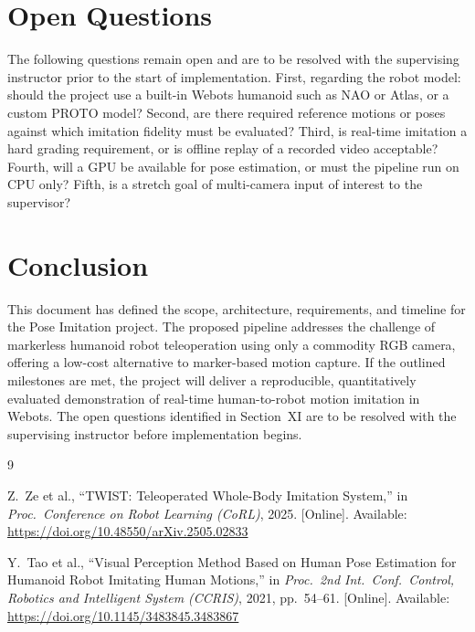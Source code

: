 \documentclass[conference]{IEEEtran}
\begin{document}
\section{Open Questions}
The following questions remain open and are to be resolved with the supervising instructor
prior to the start of implementation. First, regarding the robot model: should the project
use a built-in Webots humanoid such as NAO or Atlas, or a custom PROTO model? Second, are
there required reference motions or poses against which imitation fidelity must be evaluated?
Third, is real-time imitation a hard grading requirement, or is offline replay of a recorded
video acceptable? Fourth, will a GPU be available for pose estimation, or must the pipeline
run on CPU only? Fifth, is a stretch goal of multi-camera input of interest to the supervisor?
 
\section{Conclusion}
This document has defined the scope, architecture, requirements, and timeline for the Pose
Imitation project. The proposed pipeline addresses the challenge of markerless humanoid robot
teleoperation using only a commodity RGB camera, offering a low-cost alternative to
marker-based motion capture. If the outlined milestones are met, the project will deliver a
reproducible, quantitatively evaluated demonstration of real-time human-to-robot motion
imitation in Webots. The open questions identified in Section~XI are to be resolved with the
supervising instructor before implementation begins.
 
\begin{thebibliography}{9}
 
Z.~Ze et al., ``TWIST: Teleoperated Whole-Body Imitation System,''
in \textit{Proc.\ Conference on Robot Learning (CoRL)}, 2025.
[Online]. Available: \url{https://doi.org/10.48550/arXiv.2505.02833}
 
Y.~Tao et al., ``Visual Perception Method Based on Human Pose Estimation for Humanoid
Robot Imitating Human Motions,'' in \textit{Proc.\ 2nd Int.\ Conf.\ Control, Robotics and
Intelligent System (CCRIS)}, 2021, pp.~54--61.
[Online]. Available: \url{https://doi.org/10.1145/3483845.3483867}
 
\end{thebibliography}
 
\end{document}
